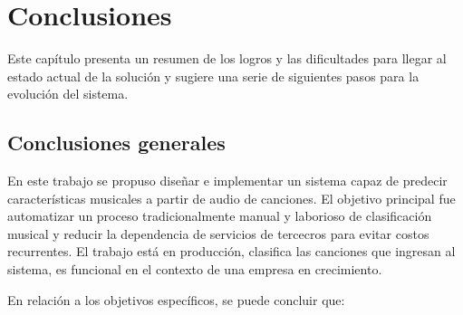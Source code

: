 
\chapter{Conclusiones} %

Este capítulo presenta un resumen de los logros y las dificultades para llegar al estado actual de la solución y sugiere una serie de siguientes pasos para la evolución del sistema.

\label{Chapter5} %

\section{Conclusiones generales}

En este trabajo se propuso diseñar e implementar un sistema capaz de predecir características musicales a partir de audio de canciones. El objetivo principal fue automatizar
un proceso tradicionalmente manual y laborioso de clasificación musical y reducir la dependencia de servicios de tercecros para evitar costos recurrentes.
El trabajo está en producción, clasifica las canciones que ingresan al sistema, es funcional en el contexto de una empresa en crecimiento. 

En relación a los objetivos específicos, se puede concluir que:



